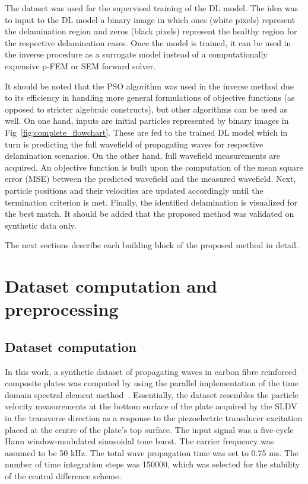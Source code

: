 \documentclass[pdflatex,sn-mathphys-num]{sn-jnl}%
\begin{document}
	The dataset was used for the supervised training of the DL model.
	The idea was to input to the DL model a binary image in which ones (white 
	pixels) represent  the delamination region and zeros (black pixels) 
	represent the healthy region for the respective delamination cases.
	Once the model is trained, it can be used in the inverse procedure as a 
	surrogate model instead of a computationally expensive p-FEM or SEM forward 
	solver.
	
	It should be noted that the PSO algorithm was used in the inverse method 
	due to its efficiency in handling more general formulations of objective 
	functions (as opposed to stricter algebraic constructs), but other 
	algorithms can be used as well. 
	On one hand, inputs are initial particles represented by binary images in 
	Fig~\ref{fig:complete_flowchart}.
	These are fed to the trained DL model which in turn is predicting the full 
	wavefield of propagating waves for respective delamination scenarios.
	On the other hand, full wavefield measurements are acquired. 
	An objective function is built upon the computation of the mean square 
	error (MSE) between the predicted wavefield and the measured wavefield.
	Next, particle positions and their velocities are updated accordingly until 
	the termination criterion is met.
	Finally, the identified delamination is visualized for the best match.
	It should be added that the proposed method was validated on synthetic data 
	only. 
	
	The next sections describe each building block of the proposed method in 
	detail.
	\section{Dataset computation and preprocessing}\label{sec3}
	\subsection{Dataset computation}\label{subsec1}
	In this work, a synthetic dataset of propagating waves in carbon fibre 
	reinforced composite plates was computed by using the parallel 
	implementation of the time domain spectral element 
	method~\cite{Kudela2020}. 
	Essentially, the dataset resembles the particle velocity measurements at 
	the bottom surface of the plate acquired by the SLDV in the transverse 
	direction as a response to the piezoelectric transducer excitation placed 
	at the centre of the plate's top surface. 
	The input signal was a five-cycle Hann window-modulated sinusoidal tone 
	burst. 
	The carrier frequency was assumed to be 50 kHz. 
	The total wave propagation time was set to 0.75 ms.
	The number of time integration steps was 150000, which was selected for the 
	stability of the central difference scheme.
	
\end{document}
